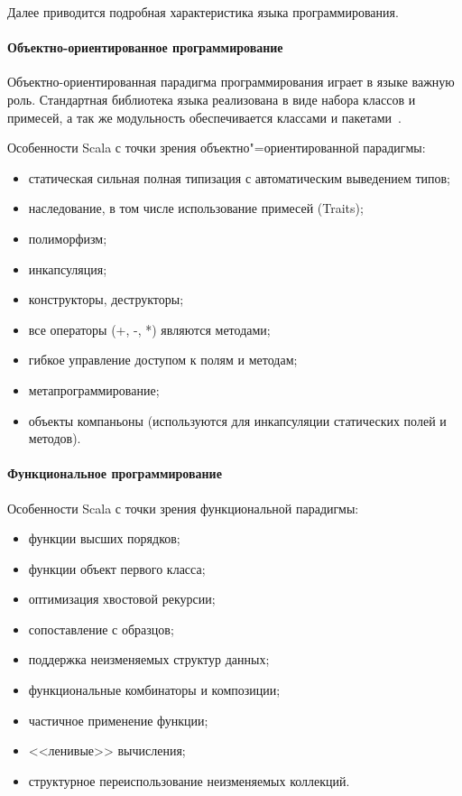 Далее приводится подробная характеристика языка программирования.

\paragraph{Объектно-ориентированное программирование}
Объектно-ориентированная парадигма программирования играет в языке важную роль. Стандартная библиотека языка реализована в виде набора классов и примесей, а так же модульность обеспечивается классами и пакетами~\cite{horsman_scala}.

Особенности Scala с точки зрения объектно"=ориентированной парадигмы:
\begin{itemize}
  \item статическая сильная полная типизация с автоматическим выведением типов;
  \item наследование, в том числе использование примесей (Traits);
  \item полиморфизм;
  \item инкапсуляция;
  \item конструкторы, деструкторы;
  \item все операторы (+, -, *) являются методами;
  \item гибкое управление доступом к полям и методам;
  \item метапрограммирование;
  \item объекты компаньоны (используются для инкапсуляции статических полей и методов).
\end{itemize}

\paragraph{Функциональное программирование}
Особенности Scala с точки зрения функциональной парадигмы:
\begin{itemize}
  \item функции высших порядков;
  \item функции объект первого класса;
  \item оптимизация хвостовой рекурсии;
  \item сопоставление с образцов;
  \item поддержка неизменяемых структур данных;
  \item функциональные комбинаторы и композиции;
  \item частичное применение функции;
  \item <<ленивые>> вычисления;
  \item структурное переиспользование неизменяемых коллекций.
\end{itemize}

